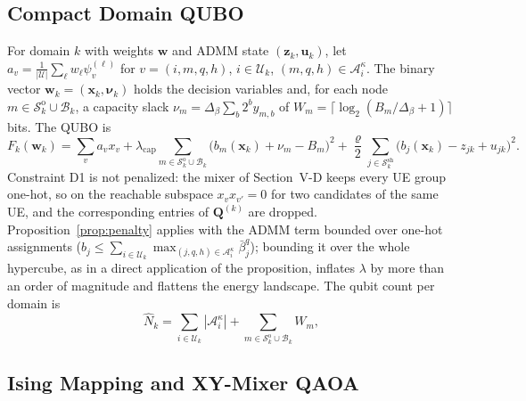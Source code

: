 \subsection{Compact Domain QUBO}

For domain $k$ with weights $\mathbf{w}$ and ADMM state $(\mathbf{z}_k,\mathbf{u}_k)$, let
$a_v=\frac{1}{|\mathscr{U}|}\sum_\ell w_\ell\psi^{(\ell)}_v$ for $v=(i,m,q,h)$, $i\in\mathscr{U}_k$,
$(m,q,h)\in\mathscr{A}^{\kappa}_i$. The binary vector $\mathbf{w}_k=(\mathbf{x}_k,\boldsymbol{\nu}_k)$ holds the
decision variables and, for each node $m\in\mathscr{S}^{\mathrm{o}}_k\cup\mathscr{B}_k$, a capacity slack
$\nu_m=\Delta_\beta\sum_{b}2^b y_{m,b}$ of $W_m=\lceil\log_2(B_m/\Delta_\beta+1)\rceil$ bits. The QUBO is
\begin{equation}
    F_k(\mathbf{w}_k)=\sum_{v}a_v x_v
    +\lambda_{\mathrm{cap}}\!\!\sum_{m\in\mathscr{S}^{\mathrm{o}}_k\cup\mathscr{B}_k}\!\!\bigl(b_m(\mathbf{x}_k)+\nu_m-B_m\bigr)^2
    +\frac{\varrho}{2}\sum_{j\in\mathscr{S}^{\mathrm{sh}}_k}\bigl(b_j(\mathbf{x}_k)-z_{jk}+u_{jk}\bigr)^2 .
    \label{eq:Fk_compact}
\end{equation}
Constraint D1 is not penalized: the mixer of Section~V-D keeps every UE group one-hot, so on the reachable subspace
$x_vx_{v'}=0$ for two candidates of the same UE, and the corresponding entries of $\mathbf{Q}^{(k)}$ are dropped.
Proposition~\ref{prop:penalty} applies with the ADMM term bounded over one-hot assignments
($b_j\leq\sum_{i\in\mathscr{U}_k}\max_{(j,q,h)\in\mathscr{A}^\kappa_i}\bar\beta^q_j$); bounding it over the whole
hypercube, as in a direct application of the proposition, inflates $\lambda$ by more than an order of magnitude and
flattens the energy landscape. The qubit count per domain is
\begin{equation}
    \hat{N}_k=\sum_{i\in\mathscr{U}_k}|\mathscr{A}^{\kappa}_i|+\sum_{m\in\mathscr{S}^{\mathrm{o}}_k\cup\mathscr{B}_k}W_m,
    \label{eq:Nk_compact}
\end{equation}

\subsection{Ising Mapping and XY-Mixer QAOA}

